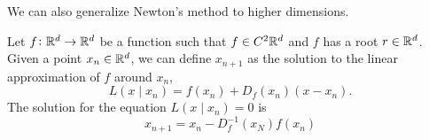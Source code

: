 \documentclass[11pt,a4paper]{article}
\begin{document}
We can also generalize Newton's method to higher dimensions.

Let $f \colon \mathbb{R}^d \to \mathbb{R}^d$ be a function such that $f \in C^2{\mathbb{R}^d}$
and $f$ has a root $r \in \mathbb{R}^d$.
Given a point $x_n \in \mathbb{R}^d$, we can define $x_{n + 1}$ as the solution
to the linear approximation of $f$ around $x_n$,
\[
  L(x \mid x_n) = f(x_n) + D_f(x_n)(x - x_n).
\]
The solution for the equation $L(x \mid x_n) = 0$ is
\[
  x_{n + 1} = x_n- D_f^{-1}(x_N) f(x_n)
\]
\end{document}
